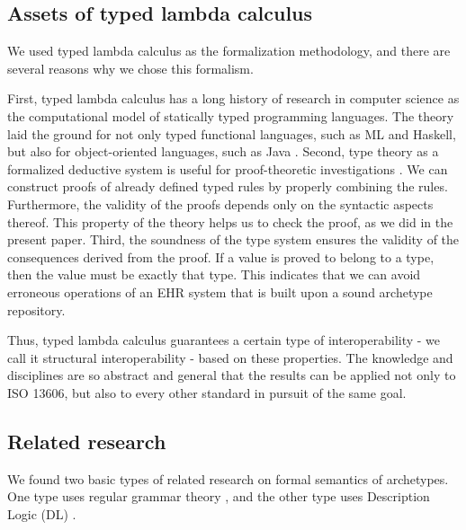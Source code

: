 \documentclass[preprint,3p,onecolumn,times,review]{article}
\begin{document}
{\subsection{Assets of typed lambda calculus}

We used typed lambda calculus as the formalization methodology, and there are several reasons why we chose this formalism.

First, typed lambda calculus has a long history of research in computer science as the computational model of statically typed programming languages. The theory laid the ground for not only typed functional languages, such as ML and Haskell, but also for object-oriented languages, such as Java \cite{igarashi01:_feath_java,barendregt13:_lambd_calcul_types}.
Second, type theory as a formalized deductive system is useful for proof-theoretic investigations \cite[p.9]{program13:_homot_type_theor}. We can construct proofs of already defined typed rules by properly combining the rules. Furthermore, the validity of the proofs depends only on the syntactic aspects thereof. This property of the theory helps us to check the proof, as we did in the present paper.
Third, the soundness of the type system ensures the validity of the consequences derived from the proof. If a value is proved to belong to a type, then the value must be exactly that type. This indicates that we can avoid erroneous operations of an EHR system that is built upon a sound archetype repository.

Thus, typed lambda calculus guarantees a certain type of interoperability - we call it structural interoperability - based on these properties. The knowledge and disciplines are so abstract and general that the results can be applied not only to ISO 13606, but also to every other standard in pursuit of the same goal.


\subsection{Related research}

We found two basic types of related research on formal semantics of archetypes. One type uses regular grammar theory \cite{jose09:_linkeh_ed,maldonado07:_framew_for_clinic_data_stand_based_archet}, and the other type uses Description Logic (DL) \cite{martinez-costa08:_model_driven_approac_for_repres,maldonado12:_using_resear_ehr,lezcano11:_integ_owl_swrl,martinez-costa10:_iso_en_openeh,costa12:_towar}.

}
\end{document}
